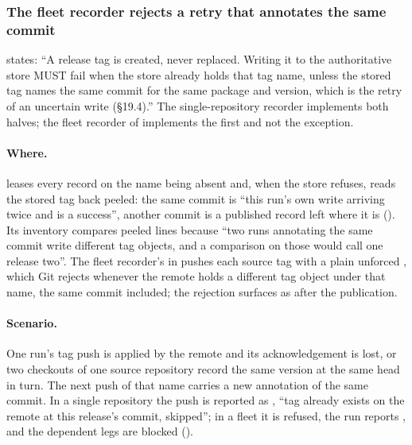 \subsubsection{The fleet recorder rejects a retry that annotates the same commit}

\begin{obligation}
\label{ob:records}
 states: ``A release tag is created, never replaced. Writing it
to the authoritative store MUST fail when the store already holds that tag
name, unless the stored tag names the same commit for the same package and
version, which is the retry of an uncertain write (\S19.4).'' The
single-repository recorder implements both halves; the fleet recorder of
 implements the first and not the exception.
\end{obligation}

\paragraph{Where.}  leases every record on the name
being absent and, when the store refuses, reads the stored tag back peeled:
the same commit is ``this run's own write arriving twice and is a success'',
another commit is a published record left where it is (). Its
inventory compares peeled lines because ``two runs annotating the same
commit write different tag objects, and a comparison on those would call one
release two''. The fleet recorder's  in
 pushes each source tag with a plain unforced
, which Git rejects whenever the remote holds a different tag
object under that name, the same commit included; the rejection surfaces as
 after the publication.

\paragraph{Scenario.} One run's tag push is applied by the remote and its
acknowledgement is lost, or two checkouts of one source repository record
the same version at the same head in turn. The next push of that name
carries a new annotation of the same commit. In a single repository the push
is reported as , ``tag already exists on the remote at this
release's commit, skipped''; in a fleet it is refused, the run reports
, and the dependent legs are blocked ().

